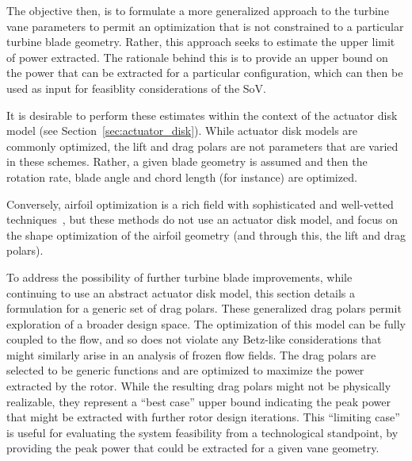 The objective then, is to formulate a more generalized approach to the
turbine vane parameters to permit an optimization that is not
constrained to a particular turbine blade geometry. Rather, this
approach seeks to estimate the upper limit of power extracted. The
rationale behind this is to provide an upper bound on the power that can 
be extracted for a particular configuration, which can then be used as
input for feasiblity considerations of the SoV.  

It is desirable to perform these estimates within the context of the
actuator disk model (see Section~\ref{sec:actuator_disk}). While
actuator disk models are commonly
optimized\cite{790585,WE:WE487,en5093425,adkins1983design}, the lift and 
drag polars are not parameters that are varied in these schemes. Rather,
a given blade geometry is assumed and then the rotation rate, blade
angle and chord length (for instance) are optimized.   

Conversely, airfoil optimization is a rich field with sophisticated and
well-vetted
techniques~\cite{drela1998pros,lewis2001aerodynamic,Chehouri2015361},
but these methods do not use an actuator disk model, and focus on the
shape optimization of the airfoil geometry (and through this, the lift
and drag polars).  

To address the possibility of further turbine blade
improvements, while continuing to use an abstract actuator disk model,
this section details a formulation for a generic set of drag 
polars. These generalized drag polars permit exploration of a broader
design space. The optimization of this model can be fully coupled to the
flow, and so does not violate any Betz-like considerations that might
similarly arise in an analysis of frozen flow fields.
The drag polars are selected to be generic functions and are optimized to
maximize the power extracted by the rotor. While the resulting drag
polars might not be physically  realizable, they represent a ``best
case'' upper bound indicating the peak power that might be extracted
with further rotor design iterations. This ``limiting case'' is useful
for evaluating the system feasibility from a technological standpoint,
by providing the peak power that could be extracted for a given vane
geometry. 


